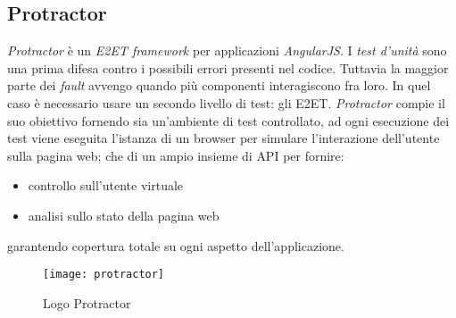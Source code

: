 \subsection{Protractor}
\textit{Protractor} è un \textit{\gls{E2ET} framework} per applicazioni
\textit{AngularJS}. I \textit{test d'unità} sono una prima difesa contro i
possibili errori presenti nel codice. Tuttavia la maggior parte dei
\textit{fault} avvengo quando più componenti interagiscono fra loro.
In quel caso è necessario usare un secondo livello di test: gli \gls{E2ET}.
\textit{Protractor} compie il suo obiettivo fornendo sia un'ambiente di test
controllato, ad ogni esecuzione dei test viene eseguita l'istanza di un browser
per simulare l'interazione dell'utente sulla pagina web; che di un ampio insieme
di \gls{API} per fornire:
\begin{itemize}
\item controllo sull'utente virtuale
\item analisi sullo stato della pagina web
\end{itemize}
garantendo copertura totale su ogni aspetto dell'applicazione.

\begin{figure}[H]
\begin{center}
\texttt{[image: protractor]}
\caption{Logo Protractor}
\label{fig:protractor_logo}
\end{center}
\end{figure}
